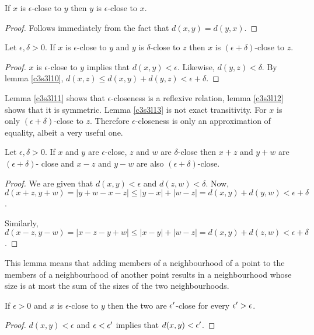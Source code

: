 \begin{lem}\label{c3s3l12}
If $x$ is $\epsilon$-close to $y$ then $y$ is $\epsilon$-close to $x$.
\end{lem}
\begin{proof}
Follows immediately from the fact that $d(x, y) = d(y, x)$.
\end{proof}

\begin{lem}\label{c3s3l13}
Let $\epsilon, \delta > 0$. If $x$ is $\epsilon$-close to $y$ and $y$ is
$\delta$-close to $z$ then $x$ is $(\epsilon + \delta)$-close to $z$.
\end{lem}
\begin{proof}
$x$ is $\epsilon$-close to $y$ implies that $d(x, y) < \epsilon$. Likewise,
$d(y, z) < \delta$. By lemma \ref{c3s3l10}, $d(x, z) \le d(x, y) + d(y, z)
< \epsilon + \delta$.
\end{proof}

\begin{rem}
Lemma \ref{c3s3l11} shows that $\epsilon$-closeness is a reflexive 
relation, lemma \ref{c3s3l12} shows that it is symmetric. Lemma 
\ref{c3s3l13} is not exact transitivity. For $x$ is only $(\epsilon +
\delta)$-close to $z$. Therefore $\epsilon$-closeness is only an 
approximation of equality, albeit a very useful one.
\end{rem}

\begin{lem}\label{c3s3l14}
Let $\epsilon, \delta > 0$. If $x$ and $y$ are $\epsilon$-close, $z$ and
$w$ are $\delta$-close then $x + z$ and $y + w$ are $(\epsilon + \delta)$-
close and $x - z$ and $y - w$ are also $(\epsilon + \delta)$-close.
\end{lem}
\begin{proof}
We are given that $d(x, y) < \epsilon$ and $d(z, w) < \delta$. Now, $d(
x + z, y + w) = |y + w - x - z| \le |y - x| + |w - z| = d(x, y) + d(y, w)
< \epsilon + \delta$.

Similarly, $d(x - z, y - w) = |x - z - y + w| \le |x - y| + |w - z| =
d(x, y) + d(z, w) < \epsilon + \delta$.
\end{proof}

\begin{rem}
This lemma means that adding members of a neighbourhood of a point to the
members of a neighbourhood of another point results in a neighbourhood
whose size is at most the sum of the sizes of the two neighbourhoods.
\end{rem}

\begin{lem}\label{c3s3l15}
If $\epsilon > 0$ and $x$ is $\epsilon$-close to $y$ then the two are
$\epsilon^\prime$-close for every $\epsilon^\prime > \epsilon$.
\end{lem}
\begin{proof}
$d(x, y) < \epsilon$ and $\epsilon < \epsilon^\prime$ implies that $d(x, y)
< \epsilon^\prime$.
\end{proof}

